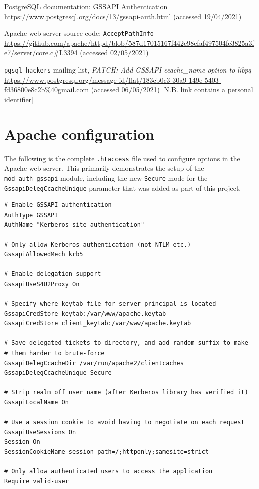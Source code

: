 \documentclass[12pt]{report}
\begin{document}
\begin{thebibliography}{99}
 PostgreSQL documentation: GSSAPI Authentication \url{https://www.postgresql.org/docs/13/gssapi-auth.html} (accessed 19/04/2021)

 Apache web server source code: \texttt{AcceptPathInfo} \url{https://github.com/apache/httpd/blob/587d17015167f442c98efaf497504fe3825a3fe7/server/core.c#L3394} (accessed 02/05/2021)

 \texttt{pgsql-hackers} mailing list, \textit{PATCH: Add GSSAPI ccache\_name option to libpq} \url{https://www.postgresql.org/message-id/flat/183cb0c3-30a9-149e-5403-fd36800e8c2b%40gmail.com} (accessed 06/05/2021) [N.B. link contains a personal identifier]


\end{thebibliography}

\appendix
\chapter{Apache configuration}
\label{sec:appendix1}
The following is the complete \verb+.htaccess+ file used to configure options in the Apache web server. This primarily demonstrates the setup of the \verb+mod_auth_gssapi+ module, including the new \texttt{Secure} mode for the \texttt{GssapiDelegCcacheUnique} parameter that was added as part of this project.

\begin{verbatim}
# Enable GSSAPI authentication
AuthType GSSAPI
AuthName "Kerberos site authentication"

# Only allow Kerberos authentication (not NTLM etc.)
GssapiAllowedMech krb5

# Enable delegation support
GssapiUseS4U2Proxy On

# Specify where keytab file for server principal is located
GssapiCredStore keytab:/var/www/apache.keytab
GssapiCredStore client_keytab:/var/www/apache.keytab

# Save delegated tickets to directory, and add random suffix to make
# them harder to brute-force
GssapiDelegCcacheDir /var/run/apache2/clientcaches
GssapiDelegCcacheUnique Secure

# Strip realm off user name (after Kerberos library has verified it)
GssapiLocalName On

# Use a session cookie to avoid having to negotiate on each request
GssapiUseSessions On
Session On
SessionCookieName session path=/;httponly;samesite=strict

# Only allow authenticated users to access the application
Require valid-user
\end{verbatim}
\end{document}
